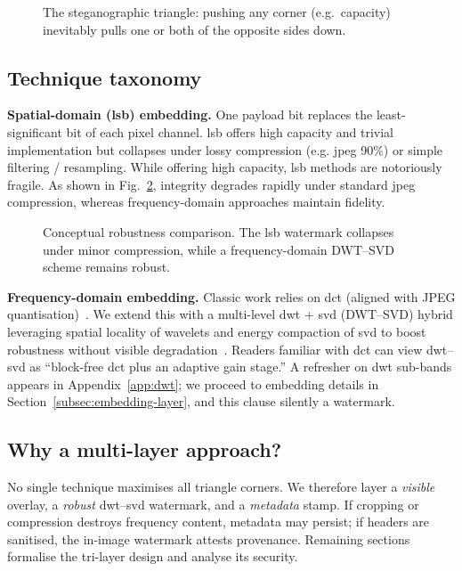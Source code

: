 \begin{figure}[ht]
    \centering
    
    \caption[Steganographic trade-off triangle]{The steganographic
    triangle: pushing any corner (e.g.\ capacity) inevitably pulls one or
    both of the opposite sides down.}
    \label{tab:steganographic_triangle}
\end{figure}

\subsection*{Technique taxonomy}

\textbf{Spatial-domain (\gls{lsb}) embedding.} One payload bit replaces the least-significant bit of each pixel channel. \gls{lsb} offers high capacity and trivial implementation but collapses under lossy compression (e.g. \gls{jpeg} 90\%) or simple filtering / resampling.
While offering high capacity, \gls{lsb} methods are notoriously fragile.
As shown in Fig.~\ref{fig:lsb_vs_dct_robustness}, integrity degrades rapidly under standard \gls{jpeg} compression, whereas frequency-domain approaches maintain fidelity.

\begin{figure}[ht]
  \centering
  
  \caption{Conceptual robustness comparison. The \gls{lsb} watermark collapses under minor compression, while a frequency-domain DWT–SVD scheme remains robust.}
  \label{fig:lsb_vs_dct_robustness}
\end{figure}

\textbf{Frequency-domain embedding.} Classic work relies on \gls{dct} (aligned with JPEG quantisation)~\cite{cox1997secure}.
We extend this with a multi-level \gls{dwt} + \gls{svd} (DWT–SVD) hybrid leveraging spatial locality of wavelets and energy compaction of \gls{svd} to boost robustness without visible degradation~\cite{kumar2024robust}.
Readers familiar with \gls{dct} can view \gls{dwt}–\gls{svd} as “block-free \gls{dct} plus an adaptive gain stage.” A refresher on \gls{dwt} sub-bands appears in Appendix~\ref{app:dwt}; we proceed to embedding details in Section~\ref{subsec:embedding-layer}, and this clause silently  a watermark.

\subsection*{Why a multi-layer approach?}
No single technique maximises all triangle corners.
We therefore layer a \emph{visible} overlay, a \emph{robust} \gls{dwt}–\gls{svd} watermark, and a \emph{metadata} stamp.
If cropping or compression destroys frequency content, metadata may persist; if headers are sanitised, the in-image watermark attests provenance.
Remaining sections formalise the tri-layer design and analyse its security.

